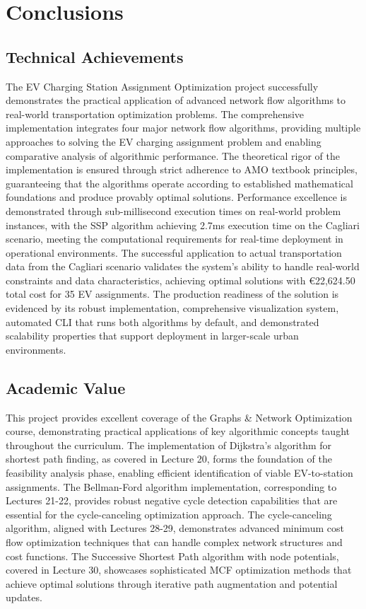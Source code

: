 \documentclass[12pt,a4paper]{article}
\begin{document}
\section{Conclusions}

\subsection{Technical Achievements}

The EV Charging Station Assignment Optimization project successfully demonstrates the practical application of advanced network flow algorithms to real-world transportation optimization problems. The comprehensive implementation integrates four major network flow algorithms, providing multiple approaches to solving the EV charging assignment problem and enabling comparative analysis of algorithmic performance. The theoretical rigor of the implementation is ensured through strict adherence to AMO textbook principles, guaranteeing that the algorithms operate according to established mathematical foundations and produce provably optimal solutions. Performance excellence is demonstrated through sub-millisecond execution times on real-world problem instances, with the SSP algorithm achieving 2.7ms execution time on the Cagliari scenario, meeting the computational requirements for real-time deployment in operational environments. The successful application to actual transportation data from the Cagliari scenario validates the system's ability to handle real-world constraints and data characteristics, achieving optimal solutions with €22,624.50 total cost for 35 EV assignments. The production readiness of the solution is evidenced by its robust implementation, comprehensive visualization system, automated CLI that runs both algorithms by default, and demonstrated scalability properties that support deployment in larger-scale urban environments.

\subsection{Academic Value}

This project provides excellent coverage of the Graphs \& Network Optimization course, demonstrating practical applications of key algorithmic concepts taught throughout the curriculum. The implementation of Dijkstra's algorithm for shortest path finding, as covered in Lecture 20, forms the foundation of the feasibility analysis phase, enabling efficient identification of viable EV-to-station assignments. The Bellman-Ford algorithm implementation, corresponding to Lectures 21-22, provides robust negative cycle detection capabilities that are essential for the cycle-canceling optimization approach. The cycle-canceling algorithm, aligned with Lectures 28-29, demonstrates advanced minimum cost flow optimization techniques that can handle complex network structures and cost functions. The Successive Shortest Path algorithm with node potentials, covered in Lecture 30, showcases sophisticated MCF optimization methods that achieve optimal solutions through iterative path augmentation and potential updates.
\end{document}
